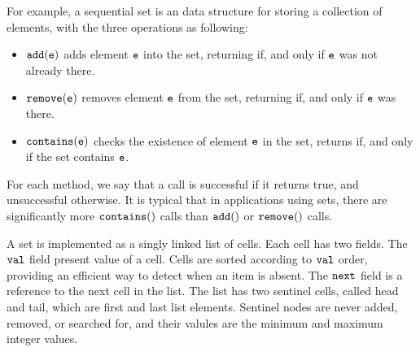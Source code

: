 For example,  a sequential set is an data structure for storing a collection of elements, with the three operations as following: 
\begin{itemize}
\item $\tt add(e)$ adds element $\tt e$ into the set, returning \true\; if, and only if $\tt e$ was not
already there. 
\item $\tt remove(e)$ removes element $\tt e$ from the set, returning \true\; if, and only if
$\tt e$ was there. 
\item $\tt contains(e)$ checks the existence of element $\tt e$ in the set, returns \true\; if, and only if the set contains $\tt e$. 
\end{itemize}
For each method, we say that a call is successful if it returns true, and unsuccessful
otherwise. It is typical that in applications using sets, there are significantly more
$\tt contains()$ calls than $\tt add()$ or $\tt remove()$ calls.

A set is implemented as a singly linked list of cells. Each cell has two fields. The $\tt val$ field present value of a cell. Cells are sorted according to $\tt val$ order, providing an efficient way to detect when an item is absent. The $\tt next$ field is a reference to
the next cell in the list. The list has two sentinel cells, called head and tail, which are first and last list elements. Sentinel nodes are never added, removed, or searched for, and their valules are the minimum and maximum integer values.
 
